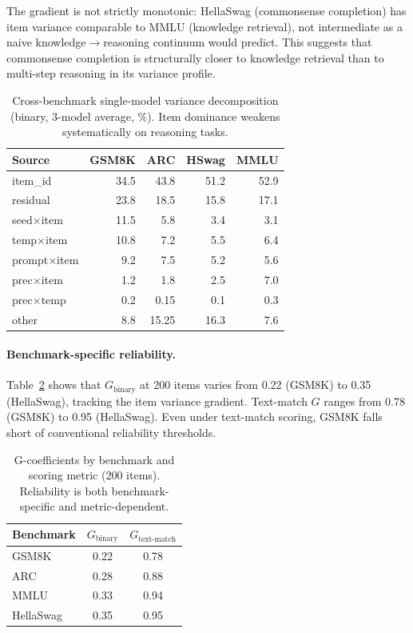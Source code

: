\documentclass[letterpaper,11pt]{article}
\begin{document}
The gradient is not strictly monotonic: HellaSwag (commonsense completion) has item variance comparable to MMLU (knowledge retrieval), not intermediate as a naive knowledge$\to$reasoning continuum would predict.
This suggests that commonsense completion is structurally closer to knowledge retrieval than to multi-step reasoning in its variance profile.

\begin{table}[t]
\centering
\caption{Cross-benchmark single-model variance decomposition (binary, 3-model average, \%). Item dominance weakens systematically on reasoning tasks.}
\label{tab:crossbench}
\small
\begin{tabular}{@{}l rrrr@{}}
\toprule
Source & GSM8K & ARC & HSwag & MMLU \\
\midrule
item\_id        & 34.5 & 43.8 & 51.2 & 52.9 \\
residual        & 23.8 & 18.5 & 15.8 & 17.1 \\
seed$\times$item    & 11.5 &  5.8 &  3.4 &  3.1 \\
temp$\times$item    & 10.8 &  7.2 &  5.5 &  6.4 \\
prompt$\times$item  &  9.2 &  7.5 &  5.2 &  5.6 \\
prec$\times$item    &  1.2 &  1.8 &  2.5 &  7.0 \\
prec$\times$temp    &  0.2 &  0.15&  0.1 &  0.3 \\
other           &  8.8 & 15.25& 16.3 &  7.6 \\
\bottomrule
\end{tabular}
\end{table}

\paragraph{Benchmark-specific reliability.}
Table~\ref{tab:gcoeff_bench} shows that $G_\text{binary}$ at 200 items varies from 0.22 (GSM8K) to 0.35 (HellaSwag), tracking the item variance gradient.
Text-match $G$ ranges from 0.78 (GSM8K) to 0.95 (HellaSwag).
Even under text-match scoring, GSM8K falls short of conventional reliability thresholds.

\begin{table}[t]
\centering
\caption{G-coefficients by benchmark and scoring metric (200 items). Reliability is both benchmark-specific and metric-dependent.}
\label{tab:gcoeff_bench}
\small
\begin{tabular}{@{}l cc@{}}
\toprule
Benchmark & $G_\text{binary}$ & $G_\text{text-match}$ \\
\midrule
GSM8K     & 0.22 & 0.78 \\
ARC       & 0.28 & 0.88 \\
MMLU      & 0.33 & 0.94 \\
HellaSwag & 0.35 & 0.95 \\
\bottomrule
\end{tabular}
\end{table}
\end{document}
